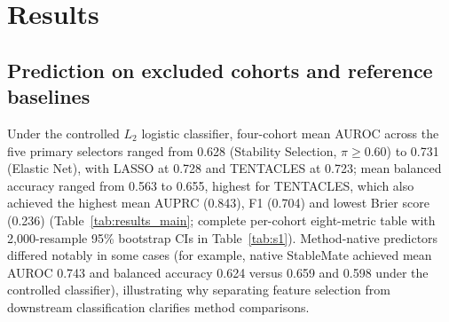 \section{Results}
\label{sec:results}
\subsection{Prediction on excluded cohorts and reference baselines}
\label{sec:results_prediction}
Under the controlled $L_2$ logistic classifier, four-cohort mean AUROC across the five primary selectors ranged from 0.628 (Stability Selection, $\pi \ge 0.60$) to 0.731 (Elastic Net), with LASSO at 0.728 and TENTACLES at 0.723; mean balanced accuracy ranged from 0.563 to 0.655, highest for TENTACLES, which also achieved the highest mean AUPRC (0.843), F1 (0.704) and lowest Brier score (0.236) (Table~\ref{tab:results_main}; complete per-cohort eight-metric table with 2,000-resample 95\% bootstrap CIs in Table~\ref{tab:s1}). Method-native predictors differed notably in some cases (for example, native StableMate achieved mean AUROC 0.743 and balanced accuracy 0.624 versus 0.659 and 0.598 under the controlled classifier), illustrating why separating feature selection from downstream classification clarifies method comparisons.


